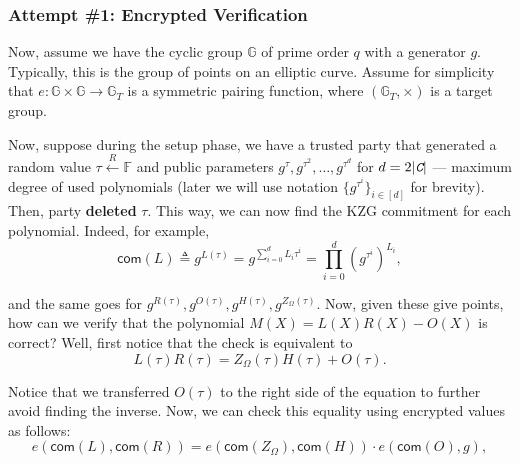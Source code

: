 \documentclass[../lecture-notes.tex]{subfiles}
\begin{document}
\subsubsection{Attempt \#1: Encrypted Verification}

Now, assume we have the cyclic group $\mathbb{G}$ of prime order $q$ with a generator $g$. Typically, this is the group of points on an elliptic curve. Assume for simplicity that $e: \mathbb{G} \times \mathbb{G} \to \mathbb{G}_T$ is a symmetric pairing function, where $(\mathbb{G}_T, \times)$ is a target group.

Now, suppose during the setup phase, we have a trusted party that generated a random value $\tau \xleftarrow{R} \mathbb{F}$ and public parameters $g^{\tau},g^{\tau^2},\dots,g^{\tau^{d}}$ for $d=2|\textit{\texttt{C}}|$ --- maximum degree of used polynomials (later we will use notation $\{g^{\tau^i}\}_{i \in [d]}$ for brevity). Then, party \textbf{deleted} $\tau$. This way, we can now find the KZG commitment for each polynomial. Indeed, for example,
\begin{equation*}
    \mathsf{com}(L) \triangleq g^{L(\tau)} = g^{\sum_{i=0}^d L_i \tau^i} = \prod_{i=0}^d (g^{\tau^i})^{L_i},
\end{equation*}

and the same goes for $g^{R(\tau)}, g^{O(\tau)}, g^{H(\tau)}, g^{Z_{\Omega}(\tau)}$. Now, given these give points, how can we verify that the polynomial $M(X) = L(X)R(X) - O(X)$ is correct? Well, first notice that the check is equivalent to
\begin{equation*}
    L(\tau)R(\tau) = Z_\Omega(\tau)H(\tau) + O(\tau).
\end{equation*}

Notice that we transferred $O(\tau)$ to the right side of the equation to further avoid finding the inverse. Now, we can check this equality using encrypted values as follows:
\begin{equation*}
    e(\mathsf{com}(L), \mathsf{com}(R)) = e(\mathsf{com}(Z_{\Omega}), \mathsf{com}(H)) \cdot e(\mathsf{com}(O), g),
\end{equation*}
\end{document}
